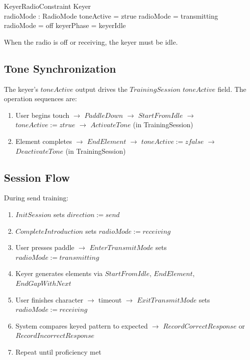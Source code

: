 \documentclass[a4paper,10pt,fleqn]{article}
\begin{document}
\begin{schema}{KeyerRadioConstraint}
Keyer \\
radioMode : RadioMode
\where
toneActive = ztrue \implies radioMode = transmitting \\
radioMode = off \implies keyerPhase = keyerIdle
\end{schema}

When the radio is off or receiving, the keyer must be idle.

\subsection{Tone Synchronization}

The keyer's $toneActive$ output drives the $TrainingSession$ $toneActive$ field.
The operation sequences are:

\begin{enumerate}
\item User begins touch $\rightarrow$ $PaddleDown$ $\rightarrow$ $StartFromIdle$
      $\rightarrow$ $toneActive := ztrue$ $\rightarrow$ $ActivateTone$ (in TrainingSession)
\item Element completes $\rightarrow$ $EndElement$ $\rightarrow$ $toneActive := zfalse$
      $\rightarrow$ $DeactivateTone$ (in TrainingSession)
\end{enumerate}

\subsection{Session Flow}

During send training:

\begin{enumerate}
\item $InitSession$ sets $direction := send$
\item $CompleteIntroduction$ sets $radioMode := receiving$
\item User presses paddle $\rightarrow$ $EnterTransmitMode$ sets $radioMode := transmitting$
\item Keyer generates elements via $StartFromIdle$, $EndElement$, $EndGapWithNext$
\item User finishes character $\rightarrow$ timeout $\rightarrow$ $ExitTransmitMode$
      sets $radioMode := receiving$
\item System compares keyed pattern to expected $\rightarrow$ $RecordCorrectResponse$
      or $RecordIncorrectResponse$
\item Repeat until proficiency met
\end{enumerate}
\end{document}
